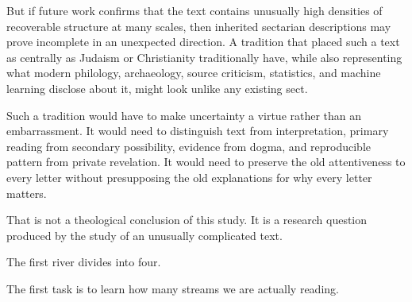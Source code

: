 But if future work confirms that the text contains unusually high densities of recoverable structure at many scales, then inherited sectarian descriptions may prove incomplete in an unexpected direction.  A tradition that placed such a text as centrally as Judaism or Christianity traditionally have, while also representing what modern philology, archaeology, source criticism, statistics, and machine learning disclose about it, might look unlike any existing sect.

Such a tradition would have to make uncertainty a virtue rather than an embarrassment.  It would need to distinguish text from interpretation, primary reading from secondary possibility, evidence from dogma, and reproducible pattern from private revelation.  It would need to preserve the old attentiveness to every letter without presupposing the old explanations for why every letter matters.

That is not a theological conclusion of this study.  It is a research question produced by the study of an unusually complicated text.

The first river divides into four.

The first task is to learn how many streams we are actually reading.

